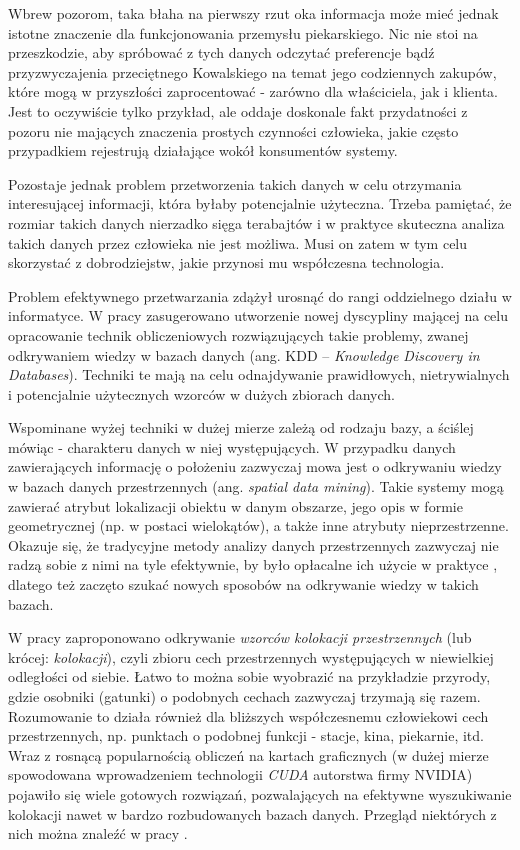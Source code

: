 \documentclass[12pt]{article}
\begin{document}
Wbrew pozorom, taka błaha na pierwszy rzut oka informacja może mieć jednak istotne znaczenie dla funkcjonowania przemysłu piekarskiego. Nic nie stoi na przeszkodzie, aby spróbować z tych danych odczytać preferencje bądź przyzwyczajenia przeciętnego Kowalskiego na temat jego codziennych zakupów, które mogą w przyszłości zaprocentować - zarówno dla właściciela, jak i klienta. Jest to oczywiście tylko przykład, ale oddaje doskonale fakt przydatności z pozoru nie mających znaczenia prostych czynności człowieka, jakie często przypadkiem rejestrują działające wokół konsumentów systemy.

Pozostaje jednak problem przetworzenia takich danych w celu otrzymania interesującej informacji, która byłaby potencjalnie użyteczna. Trzeba pamiętać, że rozmiar takich danych nierzadko sięga terabajtów i w praktyce skuteczna analiza takich danych przez człowieka nie jest możliwa. Musi on zatem w tym celu skorzystać z dobrodziejstw, jakie przynosi mu współczesna technologia.

Problem efektywnego przetwarzania zdążył urosnąć do rangi oddzielnego działu w informatyce. W pracy \cite{kdd} zasugerowano utworzenie nowej dyscypliny mającej na celu opracowanie technik obliczeniowych rozwiązujących takie problemy, zwanej odkrywaniem wiedzy w bazach danych (ang. KDD – \textit{Knowledge Discovery in Databases}). Techniki te mają na celu odnajdywanie prawidłowych,  nietrywialnych i potencjalnie użytecznych wzorców w dużych zbiorach danych.

Wspominane wyżej techniki w dużej mierze zależą od rodzaju bazy, a ściślej mówiąc - charakteru danych w niej występujących. W przypadku danych zawierających informację o położeniu zazwyczaj mowa jest o  odkrywaniu wiedzy w bazach danych przestrzennych (ang. \textit{spatial data mining}). Takie systemy mogą zawierać atrybut lokalizacji obiektu w danym obszarze, jego opis w formie geometrycznej (np. w postaci wielokątów), a także inne atrybuty nieprzestrzenne. Okazuje się, że tradycyjne metody analizy danych przestrzennych zazwyczaj nie radzą sobie z nimi na tyle efektywnie, by było opłacalne ich użycie w praktyce \cite{trad}, dlatego też zaczęto szukać nowych sposobów na odkrywanie wiedzy w takich bazach.

W pracy \cite{huang} zaproponowano odkrywanie \textit{wzorców kolokacji przestrzennych} (lub krócej: \textit{kolokacji}), czyli zbioru cech przestrzennych występujących w niewielkiej odległości od siebie.  Łatwo to można sobie wyobrazić na przykładzie przyrody, gdzie osobniki (gatunki) o podobnych cechach zazwyczaj trzymają się razem. Rozumowanie to działa również dla bliższych współczesnemu człowiekowi cech przestrzennych, np. punktach o podobnej funkcji - stacje, kina, piekarnie, itd. Wraz z rosnącą popularnością obliczeń na kartach graficznych (w dużej mierze spowodowana wprowadzeniem technologii \textit{CUDA} autorstwa firmy NVIDIA) pojawiło się wiele gotowych rozwiązań, pozwalających na efektywne wyszukiwanie kolokacji nawet w bardzo rozbudowanych bazach danych. Przegląd niektórych z nich można znaleźć w pracy \cite{boinski}.
\end{document}
